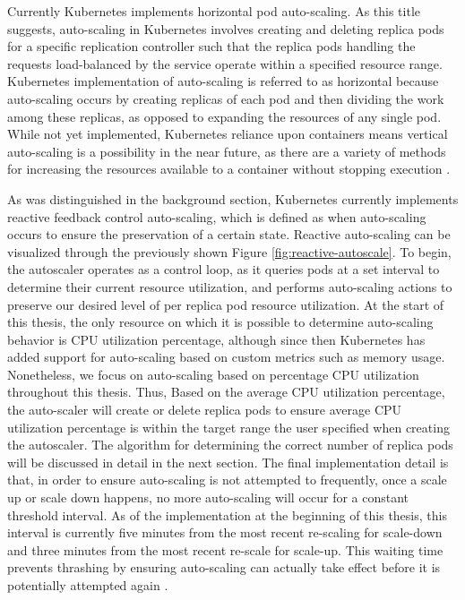 Currently Kubernetes implements horizontal pod auto-scaling.
As this title suggests, auto-scaling in
Kubernetes involves creating and deleting replica pods for a specific replication
controller such that the replica pods handling the requests load-balanced by the service
operate within a specified resource range. Kubernetes
implementation of auto-scaling is referred to as horizontal because
auto-scaling occurs by creating replicas of each pod and then dividing the work
among these replicas, as opposed to expanding the resources of any single pod.
While not yet implemented, Kubernetes reliance upon containers means vertical
auto-scaling is a possibility in the near future, as there are a variety of
methods for increasing the resources available to a container without stopping
execution \cite{docker-up-and-running}.

As was distinguished in the background section, Kubernetes currently implements reactive
feedback control auto-scaling, which is defined as when auto-scaling occurs to
ensure the preservation of a certain state. Reactive auto-scaling can be
visualized through the previously shown Figure \ref{fig:reactive-autoscale}.
To begin, the autoscaler operates as a control loop,
as it queries pods at a set interval to determine
their current resource utilization, and performs auto-scaling actions to
preserve our desired level of per replica pod resource utilization.
At the start of this thesis, the only resource on which it is possible to
determine auto-scaling behavior is CPU utilization percentage, although since
then Kubernetes has added support for auto-scaling based on custom metrics such
as memory usage. Nonetheless, we focus on auto-scaling based on percentage CPU
utilization throughout this thesis.
Thus, Based on the average CPU utilization percentage, the
auto-scaler will create or delete replica pods to ensure average CPU utilization
percentage is within the target range the user specified when creating the
autoscaler. The algorithm for determining the correct number of replica pods
will be discussed in detail in the next section. The final implementation detail
is that, in order to ensure auto-scaling is not attempted to frequently, once a
scale up or scale down happens, no more auto-scaling will occur for a constant
threshold interval. As of the implementation at the beginning of this thesis,
this interval is currently five minutes from the most recent
re-scaling for scale-down and three minutes from the most recent re-scale for
scale-up. This waiting time prevents thrashing by ensuring
auto-scaling can actually take effect before it is potentially attempted again
\cite{k8s-horizontal-pod-autoscaler-user-guide}.
